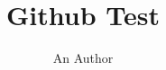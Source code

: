 \documentclass[11pt]{book}
\title{Github Test}
\author{An Author}
\begin{document}
\maketitle
\def\title#1{\chapter{#1}}
\tableofcontents

        
        
        
        
        
        
\end{document}
